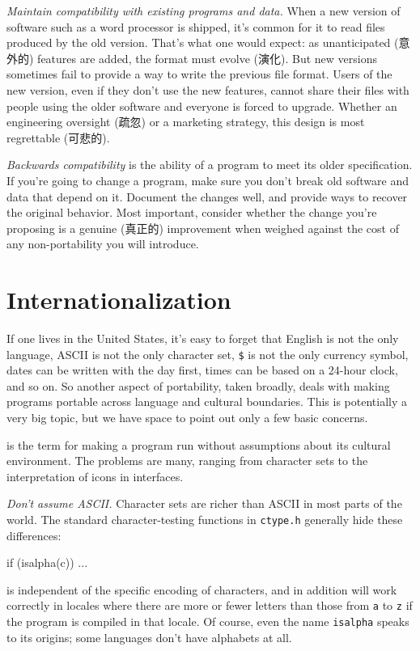 \emph{Maintain compatibility with existing programs and data.} When a new
version of software such as a word processor is shipped, it's common for it
to read files produced by the old version. That's what one would expect: as
unanticipated (意外的) features are added, the format must evolve (演化).
But new versions sometimes fail to provide a way to write the previous file
format. Users of the new version, even if they don't use the new features,
cannot share their files with people using the older software and everyone
is forced to upgrade. Whether an engineering oversight (疏忽) or a
marketing strategy, this design is most regrettable (可悲的).

\textit{Backwards compatibility} is the ability of a program to meet its
older specification.  If you're going to change a program, make sure you
don't break old software and data that depend on it. Document the changes
well, and provide ways to recover the original behavior. Most important,
consider whether the change you're proposing is a genuine (真正的)
improvement when weighed against the cost of any non-portability you will
introduce.

\section{Internationalization}
\label{sec:internationalization}

If one lives in the United States, it's easy to forget that English is not
the only language, ASCII is not the only character set, \verb'$' is not the
only currency symbol, dates can be written with the day first, times can be
based on a 24-hour clock, and so on. So another aspect of portability,
taken broadly, deals with making programs portable across language and
cultural boundaries. This is potentially a very big topic, but we have
space to point out only a few basic concerns.

 is the term for making a program run without
assumptions about its cultural environment. The problems are many, ranging
from character sets to the interpretation of icons in interfaces.

\emph{Don't assume ASCII.} Character sets are richer than ASCII in most
parts of the world.  The standard character-testing functions in
\verb'ctype.h' generally hide these differences:
\begin{wellcode}
    if (isalpha(c)) ...
\end{wellcode}
is independent of the specific encoding of characters, and in addition will
work correctly in locales where there are more or fewer letters than those
from \verb'a' to \verb'z' if the program is compiled in that locale. Of
course, even the name \verb'isalpha' speaks to its origins; some languages
don't have alphabets at all.

